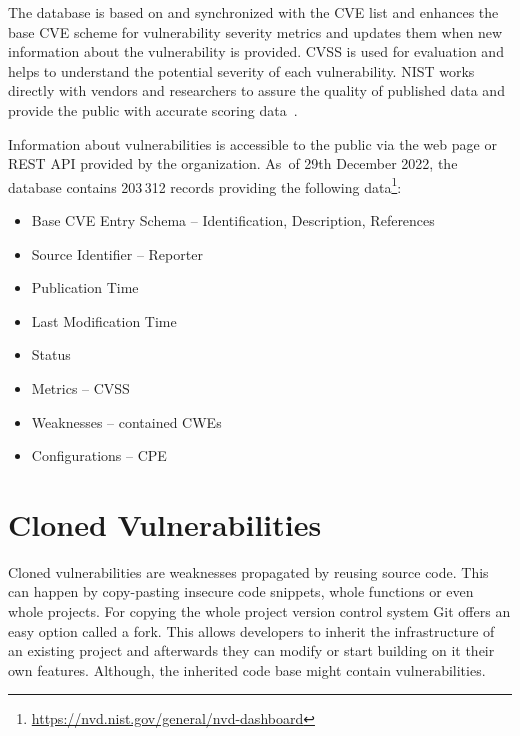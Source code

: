   The database is based on and synchronized with the CVE list and enhances the base CVE scheme for vulnerability
  severity metrics and updates them when new information about the vulnerability is provided. CVSS is used
  for evaluation and helps to understand the potential severity of each vulnerability. NIST works directly
  with vendors and researchers to assure the quality of published data and provide the public with accurate
  scoring data~\cite{NVD}.

  Information about vulnerabilities is accessible to the public via the web page or REST API provided
  by the organization. As~of 29th December 2022, the database contains 203\,312 records providing the following
  data\footnote{\href{https://nvd.nist.gov/general/nvd-dashboard}{https://nvd.nist.gov/general/nvd-dashboard}}:
  \begin{itemize}
      \item Base CVE Entry Schema -- Identification, Description, References
      \item Source Identifier -- Reporter
      \item Publication Time
      \item Last Modification Time
      \item Status
      \item Metrics -- CVSS
      \item Weaknesses -- contained CWEs
      \item Configurations -- CPE
  \end{itemize}


\newpage


\chapter{Cloned Vulnerabilities}
\label{chapter:clonedVulnerabilities}
Cloned vulnerabilities are weaknesses propagated by reusing source code. This can happen by copy-pasting
insecure code snippets, whole functions or even whole projects. For copying the whole project version control system
Git offers an easy option called a fork. This allows developers to inherit the infrastructure of an existing project
and afterwards they can modify or start building on it their own features. Although, the inherited code base might
contain vulnerabilities.

